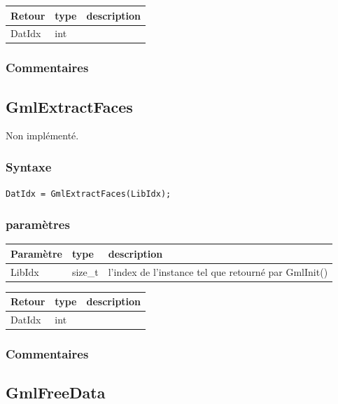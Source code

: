 \documentclass[a4paper,12pt]{article}
\begin{document}
\medskip

\begin{tabular}{|m{2cm}|m{1.5cm}|m{10.5cm}|}
\hline
Retour     & type   & description \\
\hline
DatIdx     & int    & \\
\hline
\end{tabular}

\subsubsection*{Commentaires}


\subsection{GmlExtractFaces}
Non implémenté.

\subsubsection*{Syntaxe}

{\tt DatIdx = GmlExtractFaces(LibIdx);}

\subsubsection*{paramètres}

\begin{tabular}{|m{2cm}|m{1.5cm}|m{10.5cm}|}
\hline
Paramètre  & type    & description \\
\hline
LibIdx     & size\_t & l'index de l'instance tel que retourné par GmlInit() \\
\hline
\end{tabular}

\medskip

\begin{tabular}{|m{2cm}|m{1.5cm}|m{10.5cm}|}
\hline
Retour     & type   & description \\
\hline
DatIdx     & int    & \\
\hline
\end{tabular}

\subsubsection*{Commentaires}


\subsection{GmlFreeData}
\end{document}
